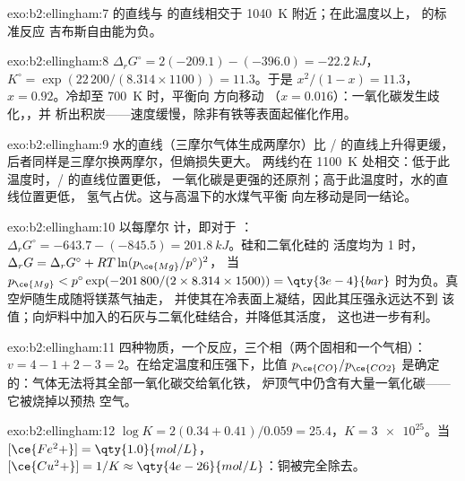 \begin{solution}{exo:b2:ellingham:7}
 的直线与  的直线相交于
\qty{1040}{K} 附近；在此温度以上， 的标准反应
吉布斯自由能为负。
\end{solution}

\begin{solution}{exo:b2:ellingham:8}
$\Delta_r G^\circ = 2(-209.1) - (-396.0) = \qty{-22.2}{kJ}$，$K^\circ =
\exp(22\,200/(8.314 \times 1100)) = 11.3$。于是 $x^2/(1 - x) = 11.3$，$x =
0.92$。冷却至 \qty{700}{K} 时，平衡向  方向移动
（$x = 0.016$）：一氧化碳发生歧化，，并
析出积炭——速度缓慢，除非有铁等表面起催化作用。
\end{solution}

\begin{solution}{exo:b2:ellingham:9}
水的直线（三摩尔气体生成两摩尔）比
/ 的直线上升得更缓，后者同样是三摩尔换两摩尔，但熵损失更大。
两线约在 \qty{1100}{K} 处相交：低于此温度时，/ 的直线位置更低，
一氧化碳是更强的还原剂；高于此温度时，水的直线位置更低，
氢气占优。这与高温下的水煤气平衡
 向左移动是同一结论。
\end{solution}

\begin{solution}{exo:b2:ellingham:10}
以每摩尔  计，即对于 ：$\Delta_r
G^\circ = -643.7 - (-845.5) = \qty{+201.8}{kJ}$。硅和二氧化硅的
活度均为 1 时，$\Delta_r G = \Delta_r G^\circ + RT\ln(p_{\ce{Mg}}/p^\circ)^2$，
当 $p_{\ce{Mg}} < p^\circ\exp(-201\,800/(2 \times 8.314 \times 1500)) =
\qty{3e-4}{bar}$ 时为负。真空炉随生成随将镁蒸气抽走，
并使其在冷表面上凝结，因此其压强永远达不到
该值；向炉料中加入的石灰与二氧化硅结合，并降低其活度，
这也进一步有利。
\end{solution}

\begin{solution}{exo:b2:ellingham:11}
四种物质，一个反应，三个相（两个固相和一个气相）：$v = 4 - 1 +
2 - 3 = 2$。在给定温度和压强下，比值 $p_{\ce{CO}}/p_{\ce{CO2}}$
是确定的：气体无法将其全部一氧化碳交给氧化铁，
炉顶气中仍含有大量一氧化碳——它被烧掉以预热
空气。
\end{solution}

\begin{solution}{exo:b2:ellingham:12}
$\log K = 2(0.34 + 0.41)/0.059 = 25.4$，$K = \num{3e25}$。当
$[\ce{Fe^2+}] = \qty{1.0}{mol/L}$，$[\ce{Cu^2+}] = 1/K \approx
\qty{4e-26}{mol/L}$：铜被完全除去。
\end{solution}

